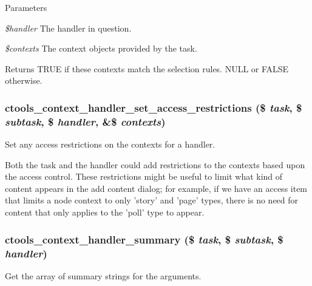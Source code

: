 \begin{DoxyParams}{Parameters}
\item[{\em \$handler}]The handler in question. \item[{\em \$contexts}]The context objects provided by the task.\end{DoxyParams}
\begin{DoxyReturn}{Returns}
TRUE if these contexts match the selection rules. NULL or FALSE otherwise. 
\end{DoxyReturn}
\hypertarget{context-task-handler_8inc_ad2948839af1d627eb4b8eade2cce0cd3}{
\subsubsection[{ctools\_\-context\_\-handler\_\-set\_\-access\_\-restrictions}]{\setlength{\rightskip}{0pt plus 5cm}ctools\_\-context\_\-handler\_\-set\_\-access\_\-restrictions (\$ {\em task}, \/  \$ {\em subtask}, \/  \$ {\em handler}, \/  \&\$ {\em contexts})}}
\label{context-task-handler_8inc_ad2948839af1d627eb4b8eade2cce0cd3}
Set any access restrictions on the contexts for a handler.

Both the task and the handler could add restrictions to the contexts based upon the access control. These restrictions might be useful to limit what kind of content appears in the add content dialog; for example, if we have an access item that limits a node context to only 'story' and 'page' types, there is no need for content that only applies to the 'poll' type to appear. \hypertarget{context-task-handler_8inc_a7a818e1d2416fc379abef23b7861541a}{
\subsubsection[{ctools\_\-context\_\-handler\_\-summary}]{\setlength{\rightskip}{0pt plus 5cm}ctools\_\-context\_\-handler\_\-summary (\$ {\em task}, \/  \$ {\em subtask}, \/  \$ {\em handler})}}
\label{context-task-handler_8inc_a7a818e1d2416fc379abef23b7861541a}
Get the array of summary strings for the arguments.

